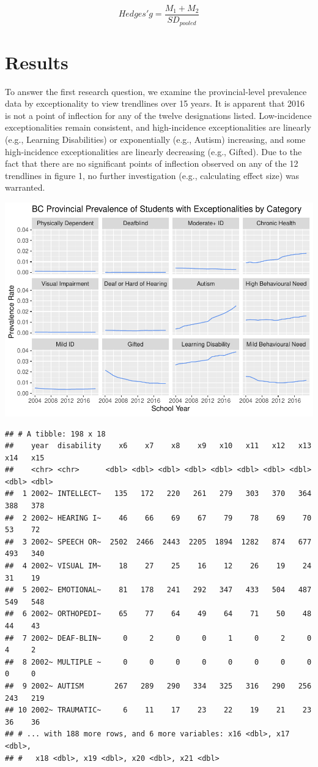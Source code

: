 \documentclass[
  english,
  man]{apa6}
\begin{document}
\[
Hedges' g = \frac{M_1 + M_2}{SD_{pooled}} 
\]

\hypertarget{results}{%
\section{Results}\label{results}}

To answer the first research question, we examine the provincial-level prevalence data by exceptionality to view trendlines over 15 years. It is apparent that 2016 is not a point of inflection for any of the twelve designations listed. Low-incidence exceptionalities remain consistent, and high-incidence exceptionalities are linearly (e.g., Learning Disabilities) or exponentially (e.g., Autism) increasing, and some high-incidence exceptionalities are linearly decreasing (e.g., Gifted). Due to the fact that there are no significant points of inflection observed on any of the 12 trendlines in figure 1, no further investigation (e.g., calculating effect size) was warranted.

\includegraphics{Final_project_files/figure-latex/Provinical_Data_Overview-1.pdf}

\begin{verbatim}
## # A tibble: 198 x 18
##    year  disability    x6    x7    x8    x9   x10   x11   x12   x13   x14   x15
##    <chr> <chr>      <dbl> <dbl> <dbl> <dbl> <dbl> <dbl> <dbl> <dbl> <dbl> <dbl>
##  1 2002~ INTELLECT~   135   172   220   261   279   303   370   364   388   378
##  2 2002~ HEARING I~    46    66    69    67    79    78    69    70    53    72
##  3 2002~ SPEECH OR~  2502  2466  2443  2205  1894  1282   874   677   493   340
##  4 2002~ VISUAL IM~    18    27    25    16    12    26    19    24    31    19
##  5 2002~ EMOTIONAL~    81   178   241   292   347   433   504   487   549   548
##  6 2002~ ORTHOPEDI~    65    77    64    49    64    71    50    48    44    43
##  7 2002~ DEAF-BLIN~     0     2     0     0     1     0     2     0     4     2
##  8 2002~ MULTIPLE ~     0     0     0     0     0     0     0     0     0     0
##  9 2002~ AUTISM       267   289   290   334   325   316   290   256   243   219
## 10 2002~ TRAUMATIC~     6    11    17    23    22    19    21    23    36    36
## # ... with 188 more rows, and 6 more variables: x16 <dbl>, x17 <dbl>,
## #   x18 <dbl>, x19 <dbl>, x20 <dbl>, x21 <dbl>
\end{verbatim}
\end{document}
